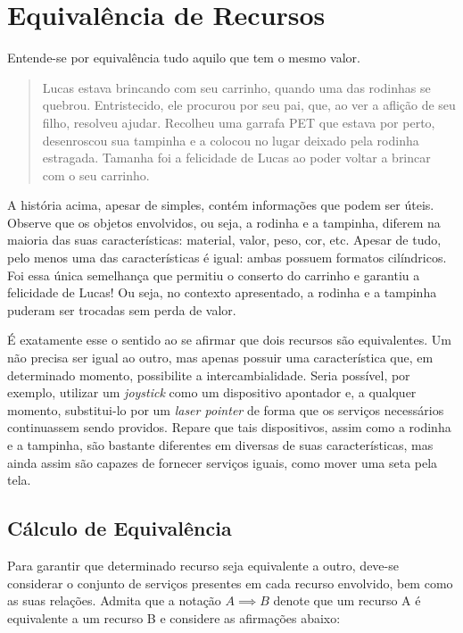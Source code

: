 \section{Equivalência de Recursos}
\label{sec:equivalenciaRecursos}

Entende-se por equivalência tudo aquilo que tem o mesmo valor.

\begin{quote}
	Lucas estava brincando com seu carrinho, quando uma das rodinhas se quebrou. Entristecido, ele procurou por seu pai, que, ao ver a aflição de seu filho, resolveu ajudar. Recolheu uma garrafa PET que estava por perto, desenroscou sua tampinha e a colocou no lugar deixado pela rodinha estragada. Tamanha foi a felicidade de Lucas ao poder voltar a brincar com o seu carrinho.
\end{quote}

A história acima, apesar de simples, contém informações que podem ser úteis. Observe que os objetos envolvidos, ou seja, a rodinha e a tampinha, diferem na maioria das suas características: material, valor, peso, cor, etc. Apesar de tudo, pelo menos uma das características é igual: ambas possuem formatos cilíndricos. Foi essa única semelhança que permitiu o conserto do carrinho e garantiu a felicidade de Lucas! Ou seja, no contexto apresentado, a rodinha e a tampinha puderam ser trocadas sem perda de valor.

É exatamente esse o sentido ao se afirmar que dois recursos são equivalentes. Um não precisa ser igual ao outro, mas apenas possuir uma característica que, em determinado momento, possibilite a intercambialidade. Seria possível, por exemplo, utilizar um \emph{joystick} como um dispositivo apontador e, a qualquer momento, substitui-lo por um \emph{laser pointer} de forma que os serviços necessários continuassem sendo providos. Repare que tais dispositivos, assim como a rodinha e a tampinha, são bastante diferentes em diversas de suas características, mas ainda assim são capazes de fornecer serviços iguais, como mover uma seta pela tela.

\subsection{Cálculo de Equivalência}

Para garantir que determinado recurso seja equivalente a outro, deve-se considerar o conjunto de serviços presentes em cada recurso envolvido, bem como as suas relações. Admita que a notação $A \implies B$ denote que um recurso A é equivalente a um recurso B e considere as afirmações abaixo:


